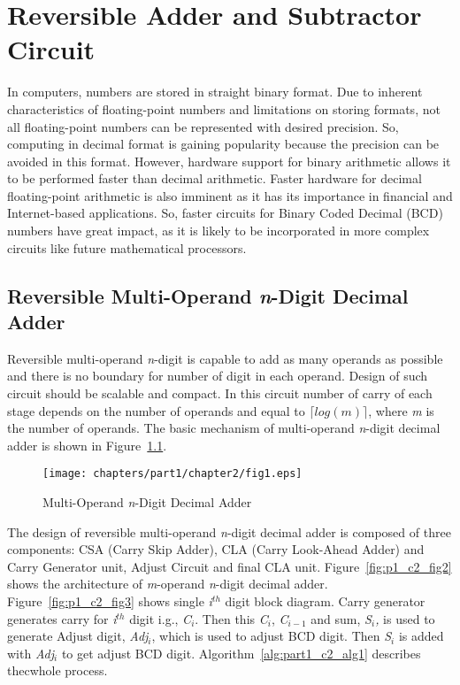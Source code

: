 \chapter{Reversible Adder and Subtractor Circuit}
\label{ch:p3__chapter2}


In computers, numbers are stored in straight binary format. Due to inherent characteristics of floating-point numbers and limitations on storing formats, not all floating-point numbers can be represented with desired precision. So, computing in decimal format is gaining popularity because the precision can be avoided in this format. However, hardware support for binary arithmetic allows it to be performed faster than decimal arithmetic. Faster hardware for decimal floating-point arithmetic is also imminent as it has its importance in financial and Internet-based applications. So, faster circuits for Binary Coded Decimal (BCD) numbers have great impact, as it is likely to be incorporated in more complex circuits like future mathematical processors.

\section{Reversible Multi-Operand {\it n}-Digit Decimal Adder}

Reversible multi-operand {\it n}-digit is capable to add as many operands as possible and there is no boundary for number of digit in each operand. Design of such circuit should be scalable and compact. In this circuit number of carry of each stage depends on the number of operands and equal to $\lceil{log(m)}\rceil$, where {\it m} is the number of operands. The basic mechanism of multi-operand {\it n}-digit decimal adder is shown in Figure~\ref{fig:p1_c2_fig1}. 

\begin{figure}[!tbh]
	\centering
	\texttt{[image: chapters/part1/chapter2/fig1.eps]}
	\caption{Multi-Operand {\it n}-Digit Decimal Adder}
	\label{fig:p1_c2_fig1}
\end{figure}

The design of reversible multi-operand {\it n}-digit decimal adder is composed of three components: CSA (Carry Skip Adder), CLA (Carry Look-Ahead Adder) and Carry Generator unit, Adjust Circuit and final CLA unit. Figure~\ref{fig:p1_c2_fig2} shows the architecture of {\it m}-operand {\it n}-digit decimal adder. Figure~\ref{fig:p1_c2_fig3} shows single {\it i${}^{th}$} digit block diagram. Carry generator generates carry for {\it i${}^{th}$} digit i.g., {\it C${}_{i}$}. Then this {\it C${}_{i}$}, {\it C${}_{i-1}$} and sum, {\it S${}_{i}$,} is used to generate Adjust digit, {\it Adj${}_{i}$}, which is used to adjust BCD digit. Then {\it S${}_{i}$} is added with {\it Adj${}_{i}$} to get adjust BCD digit. Algorithm~\ref{alg:part1_c2_alg1} describes thecwhole process.

